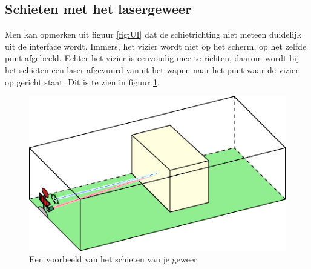\documentclass[a4paper,11pt]{article}
\begin{document}
\subsection{Schieten met het lasergeweer}
Men kan opmerken uit figuur \ref{fig:UI} dat de schietrichting niet meteen duidelijk uit de interface wordt. Immers, het vizier wordt niet op het scherm, op het zelfde punt afgebeeld. Echter het vizier is eenvoudig mee te richten, daarom wordt bij het schieten een laser afgevuurd vanuit het wapen naar het punt waar de vizier op gericht staat. Dit is te zien in figuur \ref{fig:COL}.
 
\begin{figure}[h]
\includegraphics[width=\textwidth]{Graphics/Collision.eps}
\caption{Een voorbeeld van het schieten van je geweer}
\label{fig:COL}
\end{figure}
\end{document}
